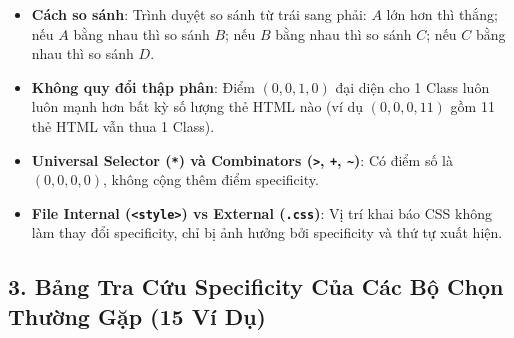 \documentclass[11pt,oneside]{book}
\newcommand{\codeinline}[1]{\textcolor{accentOrange}{\texttt{#1}}}
\begin{document}
\begin{noteBox}
\begin{itemize}[leftmargin=1.5em, itemsep=3pt, parsep=0pt]
    \item \textbf{Cách so sánh}: Trình duyệt so sánh từ trái sang phải: $A$ lớn hơn thì thắng; nếu $A$ bằng nhau thì so sánh $B$; nếu $B$ bằng nhau thì so sánh $C$; nếu $C$ bằng nhau thì so sánh $D$.
    \item \textbf{Không quy đổi thập phân}: Điểm $(0,0,1,0)$ đại diện cho 1 Class luôn luôn mạnh hơn bất kỳ số lượng thẻ HTML nào (ví dụ $(0,0,0,11)$ gồm 11 thẻ HTML vẫn thua 1 Class).
    \item \textbf{Universal Selector (\codeinline{*}) và Combinators (\codeinline{>}, \codeinline{+}, \codeinline{\~{}})}: Có điểm số là $(0,0,0,0)$, không cộng thêm điểm specificity.
    \item \textbf{File Internal (\codeinline{<style>}) vs External (\codeinline{.css})}: Vị trí khai báo CSS không làm thay đổi specificity, chỉ bị ảnh hưởng bởi specificity và thứ tự xuất hiện.
\end{itemize}
\end{noteBox}

\subsection{3. Bảng Tra Cứu Specificity Của Các Bộ Chọn Thường Gặp (15 Ví Dụ)}
\end{document}

